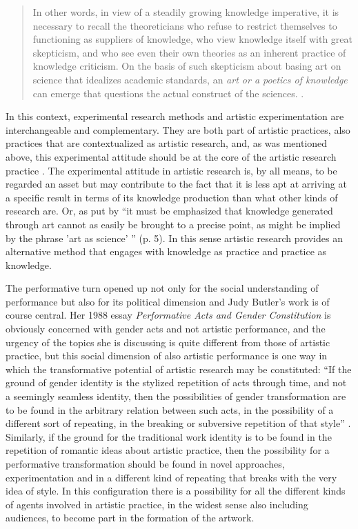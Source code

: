 \documentclass[11pt]{article}
\begin{document}
\begin{quote}
  In other words, in view of a steadily growing knowledge imperative,
  it is necessary to recall the theoreticians who refuse to restrict
  themselves to functioning as suppliers of knowledge, who view
  knowledge itself with great skepticism, and who see even their own
  theories as an inherent practice of knowledge criticism. On the
  basis of such skepticism about basing art on science that idealizes
  academic standards, an \emph{art or a poetics of knowledge} can emerge that
  questions the actual construct of the sciences. \citep[p. 5]{Busch2009}.
\end{quote}

In this context, experimental research methods and artistic experimentation
are interchangeable and complementary. They are both part of artistic
practices, also practices that are contextualized as artistic research,
and, as was mentioned above, this experimental attitude should be at the core of the artistic
research practice \citep[p. 42]{frisk-ost13}. The experimental
attitude in artistic research is, by all means, to be regarded an
asset but may
contribute to the fact that it is less apt at arriving at a
specific result in terms of its knowledge production than what other
kinds of research are. Or, as put by \citet{Busch2009} ``it must be
emphasized that knowledge generated through art cannot as easily be
brought to a precise point, as might be implied by the phrase 'art as
science' '' (p. 5). In this sense artistic research provides an
alternative method that engages with knowledge as practice and
practice as knowledge.

The performative turn opened up not only for the
social understanding of performance but also for its political
dimension and Judy Butler's work is of course central. Her 1988
essay \emph{Performative Acts and Gender Constitution} is obviously
concerned with gender acts and not artistic performance, and the
urgency of the topics she is discussing is quite different from those
of artistic practice, but this social dimension of also artistic
performance is one way in which the transformative potential of
artistic research may be constituted: ``If the ground of gender
identity is the stylized repetition of acts through time, and not a
seemingly seamless identity, then the possibilities of gender
transformation are to be found in the arbitrary relation between such
acts, in the possibility of a different sort of repeating, in the
breaking or subversive repetition of that style''
\citep[p. 520]{Butler1988}. Similarly, if the ground for the traditional
work identity is to be found in the repetition of romantic ideas about
artistic practice, then the possibility for a
performative transformation should be found in novel approaches,
experimentation and in a different kind of repeating that breaks with
the very idea of style. In this configuration there is a possibility
for all the different kinds of agents involved in artistic practice,
in the widest sense also including audiences, to become part in the
formation of the artwork.
\end{document}
